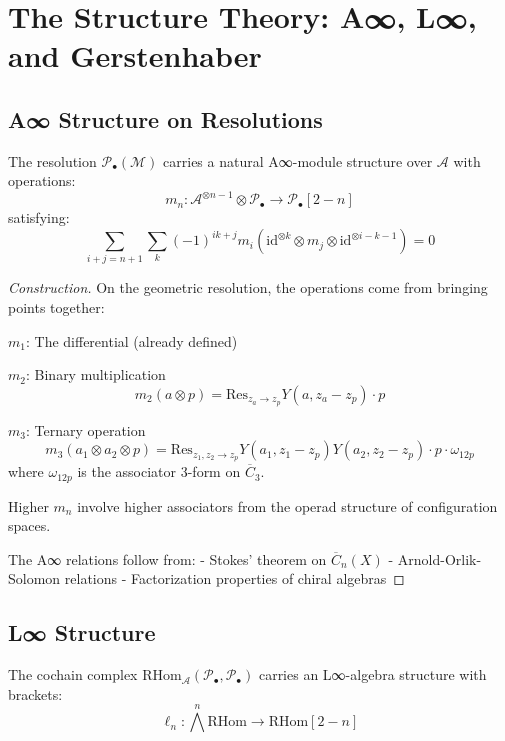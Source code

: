 \section{The Structure Theory: A∞, L∞, and Gerstenhaber}

\subsection{A∞ Structure on Resolutions}

\begin{theorem}[A∞ Structure]
The resolution $\mathcal{P}_\bullet(\mathcal{M})$ carries a natural A∞-module structure over $\mathcal{A}$ with operations:
\[
m_n: \mathcal{A}^{\otimes n-1} \otimes \mathcal{P}_\bullet \to \mathcal{P}_\bullet[2-n]
\]
satisfying:
\[
\sum_{i+j=n+1} \sum_k (-1)^{ik+j} m_i(\text{id}^{\otimes k} \otimes m_j \otimes \text{id}^{\otimes i-k-1}) = 0
\]
\end{theorem}

\begin{proof}[Construction]
On the geometric resolution, the operations come from bringing points together:

$m_1$: The differential (already defined)

$m_2$: Binary multiplication
\[
m_2(a \otimes p) = \text{Res}_{z_a \to z_p} Y(a, z_a - z_p) \cdot p
\]

$m_3$: Ternary operation
\[
m_3(a_1 \otimes a_2 \otimes p) = \text{Res}_{z_1, z_2 \to z_p} Y(a_1, z_1-z_p)Y(a_2, z_2-z_p) \cdot p \cdot \omega_{12p}
\]
where $\omega_{12p}$ is the associator 3-form on $\overline{C}_3$.

Higher $m_n$ involve higher associators from the operad structure of configuration spaces.

The A∞ relations follow from:
- Stokes' theorem on $\overline{C}_n(X)$
- Arnold-Orlik-Solomon relations
- Factorization properties of chiral algebras
\end{proof}

\subsection{L∞ Structure}

\begin{theorem}
The cochain complex $\text{RHom}_{\mathcal{A}}(\mathcal{P}_\bullet, \mathcal{P}_\bullet)$ carries an L∞-algebra structure with brackets:
\[
\ell_n: \bigwedge^n \text{RHom} \to \text{RHom}[2-n]
\]
\end{theorem}

